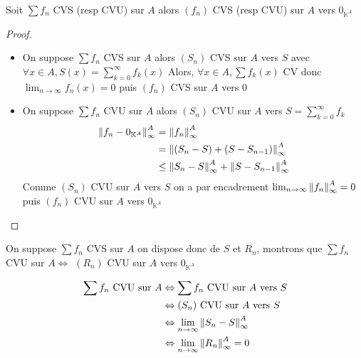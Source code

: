 \documentclass[11pt,hidelinks]{book}
\theoremstyle{mytheoremstyle}
\theoremstyle{mytheoremstyle}
\theoremstyle{mytheoremstyle}
\theoremstyle{mytheoremstyle}
\theoremstyle{mytheoremstyle}
\theoremstyle{mytheoremstyle}
\theoremstyle{mytheoremstyle}
\theoremstyle{mytheoremstyle}
\theoremstyle{myproblemstyle}
\def\mbb#1{\mathbb{#1}}
\def\bK{\mbb{K}}
\def\ln{\lim_{n \to \infty}}
\begin{document}
\begin{adjustwidth}{-2em}{-1em}
    \begin{prop}
        Soit $\sum f_n$ CVS (resp CVU) sur $A$ alors $(f_n)$ CVS (resp CVU) sur $A$ vers $0_{\bK^{A}}$
        \begin{proof}
            \begin{itemize}[label=$\circ$]
            \item On suppose $\sum f_n$ CVS sur $A$ alors $(S_n)$ CVS sur $A$ vers $S$ 
            avec $\forall x \in A, S(x) = \sum_{k=0}^{\infty} f_k(x)$
             Alors, $\forall x \in A, \sum f_k(x)$ CV donc $\ln f_n(x) = 0$
            puis $(f_n)$ CVS sur $A$ vers $0$

            \item On suppose $\sum f_n$ CVU sur $A$ alors $(S_n)$ CVU sur $A$ vers $S = \sum^{\infty}_{k=0} f_k$
            \begin{align*}
                \norm{f_n - 0_{\bK^{A}}}^{A}_{\infty} &= \norm{f_n}^{A}_{\infty} \\
                                                      &= \norm{(S_n - S) + (S - S_{n-1})}^{A}_{\infty} \\
                                                      &\leq \norm{S_n - S}^{A}_{\infty} + \norm{S - S_{n-1}}^{A}_{\infty} \\          
            \end{align*}
            Comme $(S_n)$ CVU sur $A$ vers $S$ on a par encadrement $\ln \norm{f_n}^{A}_{\infty} = 0$ puis $(f_n)$ CVU sur $A$ vers $0_{\bK^{A}}$
        \end{itemize}
        \end{proof}
    \end{prop}
    \begin{theorem}
        On suppose $\sum f_n$ CVS sur $A$ on dispose donc de $S$ et $R_n$, 
        montrons que $\sum f_n$ CVU sur $A \Leftrightarrow$ $(R_n)$ CVU sur $A$ vers $0_{\bK^{A}}$ 
        \begin{ef}
            \begin{align*}
                \sum f_n \text{ CVU sur } A &\Leftrightarrow \sum f_n \text{ CVU sur } A \text{ vers } S \\
                                            &\Leftrightarrow (S_n) \text{ CVU sur } A \text{ vers } S \\
                                            &\Leftrightarrow \ln \norm{S_n - S}^{A}_{\infty} \\
                                            &\Leftrightarrow \ln \norm{R_n}^{A}_{\infty} = 0 \\
            \end{align*}

\end{ef}
\end{theorem}
\end{adjustwidth}
\end{document}
